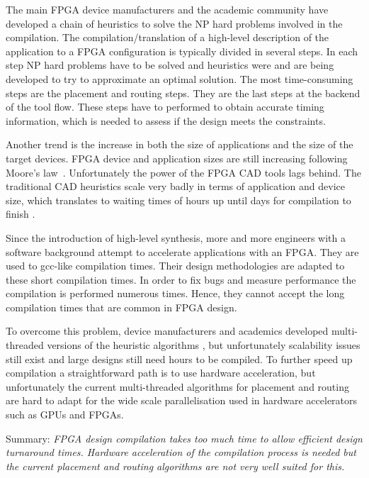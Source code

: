 \documentclass[a4paper,oneside,12pt]{article}
\begin{document}
The main FPGA device manufacturers and the academic community have developed a chain of heuristics to solve the NP hard problems involved in the compilation.
The compilation/translation of a high-level description of the application to a FPGA configuration is typically divided in several steps. In each step NP hard problems have to be solved and heuristics were and are being developed to try to approximate an optimal solution. The most time-consuming steps are the placement and routing steps. They are the last steps at the backend of the tool flow. These steps have to performed to obtain accurate timing information, which is needed to assess if the design meets the constraints. 
 
Another trend is the increase in both the size of applications and the size of the target devices. FPGA device and application sizes are still increasing following Moore's law~\cite{shannon2015technology}. Unfortunately the power of the FPGA CAD tools lags behind. The traditional CAD heuristics scale very badly in terms of application and device size, which translates to waiting times of hours up until days for compilation to finish \cite{murray2015timing}. 

Since the introduction of high-level synthesis\cite{ref naar HLS tool AutoESL http://www.eetimes.com/author.asp?section_id=36&doc_id=1284904}, more and more engineers with a software background attempt to accelerate applications with an FPGA. They are used to gcc-like compilation times. Their design methodologies are adapted to these short compilation times. In order to fix bugs and measure performance the compilation is performed numerous times. Hence, they cannot accept the long compilation times that are common in FPGA design.

To overcome this problem, device manufacturers and academics developed multi-threaded versions of the heuristic algorithms \cite{ludwin2011,gort2012,betz2013method,jain2014multi}, but unfortunately scalability issues still exist and large designs still need hours to be compiled. To further speed up compilation a straightforward path is to use hardware acceleration, but unfortunately the current multi-threaded algorithms for placement and routing are hard to adapt for the wide scale parallelisation used in hardware accelerators such as GPUs and FPGAs.

Summary: \emph{FPGA design compilation takes too much time to allow efficient design turnaround times. Hardware acceleration of the compilation process is needed but the current placement and routing algorithms are not very well suited for this.
} 
\end{document}
